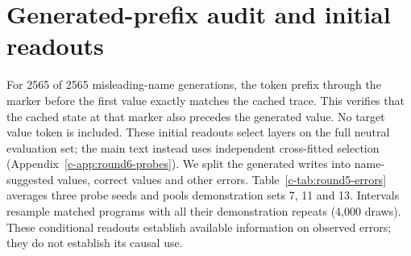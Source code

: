 \section{Generated-prefix audit and initial readouts}
\label{c-app:round5-errors}
For 2565 of 2565 misleading-name generations, the token prefix through the marker before the first value exactly matches the cached trace. This verifies that the cached state at that marker also precedes the generated value. No target value token is included.
These initial readouts select layers on the full neutral evaluation set; the main text instead uses independent cross-fitted selection (Appendix~\ref{c-app:round6-probes}). We split the generated writes into name-suggested values, correct values and other errors. Table~\ref{c-tab:round5-errors} averages three probe seeds and pools demonstration sets 7, 11 and 13. Intervals resample matched programs with all their demonstration repeats (4,000 draws). These conditional readouts establish available information on observed errors; they do not establish its causal use.
\begin{table}[t]
\centering\small
{}
\ifdim\wd\roundfivebox>\textwidth\resizebox{\textwidth}{!}{\usebox{\roundfivebox}}\else\usebox{\roundfivebox}\fi
\caption{Disjoint probes at the verified generated prefix. A dash denotes an empty stratum. The denominator is observed writes within each stratum, not independent demonstration repeats.}
\label{c-tab:round5-errors}
\end{table}
